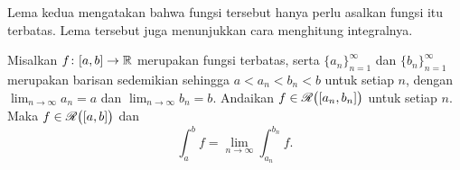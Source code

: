 Lema kedua mengatakan bahwa fungsi tersebut hanya perlu  asalkan fungsi itu terbatas.  Lema tersebut juga menunjukkan cara
menghitung integralnya.

\begin{lemma} \label{lemma:boundedimpriemann}
Misalkan $f \colon [a,b] \to {\mathbb{R}}$ merupakan fungsi terbatas, serta
$\{ a_n \}_{n=1}^\infty$ dan $\{b_n \}_{n=1}^\infty$ merupakan barisan sedemikian sehingga
$a < a_n < b_n < b$ untuk setiap $n$, dengan
$\lim_{n\to\infty} a_n = a$ dan $\lim_{n\to\infty} b_n = b$.
Andaikan $f \in {\mathscr{R}}\bigl([a_n,b_n]\bigr)$ untuk setiap $n$.
Maka $f \in {\mathscr{R}}\bigl([a,b]\bigr)$ dan
\begin{equation*}
\int_a^b f = 
\lim_{n \to \infty} \int_{a_n}^{b_n} f .
\end{equation*}
\end{lemma}

